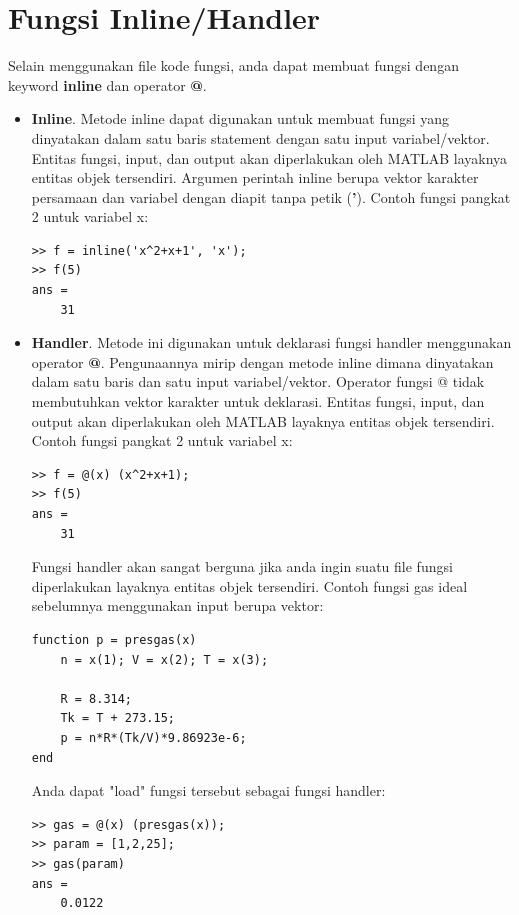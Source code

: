 \documentclass[12pt]{book}
\begin{document}
	\newpage
	\section{Fungsi Inline/Handler}
	
	Selain menggunakan file kode fungsi, anda dapat membuat fungsi dengan keyword \textbf{inline} dan operator \textbf{@}.
	
	\begin{itemize}
		\item \textbf{Inline}. Metode inline dapat digunakan untuk membuat fungsi yang dinyatakan dalam satu baris statement dengan satu input variabel/vektor.
		Entitas fungsi, input, dan output akan diperlakukan oleh MATLAB layaknya entitas objek tersendiri.
		Argumen perintah inline berupa vektor karakter persamaan dan variabel dengan diapit tanpa petik (\textbf{'}).
		Contoh fungsi pangkat 2 untuk variabel x:
		\begin{verbatim}
>> f = inline('x^2+x+1', 'x');
>> f(5)
ans =
    31
		\end{verbatim}
	
		\item \textbf{Handler}. Metode ini digunakan untuk deklarasi fungsi handler menggunakan operator \textbf{@}.
		Pengunaannya mirip dengan metode inline dimana dinyatakan dalam satu baris dan satu input variabel/vektor.
		Operator fungsi @ tidak membutuhkan vektor karakter untuk deklarasi.
		Entitas fungsi, input, dan output akan diperlakukan oleh MATLAB layaknya entitas objek tersendiri.
		Contoh fungsi pangkat 2 untuk variabel x:
		\begin{verbatim}
>> f = @(x) (x^2+x+1);
>> f(5)
ans =
    31
		\end{verbatim}
	
		Fungsi handler akan sangat berguna jika anda ingin suatu file fungsi diperlakukan layaknya entitas objek tersendiri.
		Contoh fungsi gas ideal sebelumnya menggunakan input berupa vektor:
		\begin{verbatim}
function p = presgas(x)
	n = x(1); V = x(2); T = x(3); 
	
	R = 8.314;
	Tk = T + 273.15; 
	p = n*R*(Tk/V)*9.86923e-6;
end
		\end{verbatim}
	
		Anda dapat "load" fungsi tersebut sebagai fungsi handler:
		\begin{verbatim}
>> gas = @(x) (presgas(x));
>> param = [1,2,25];
>> gas(param)
ans = 
    0.0122
		\end{verbatim}
	\end{itemize}
\end{document}
